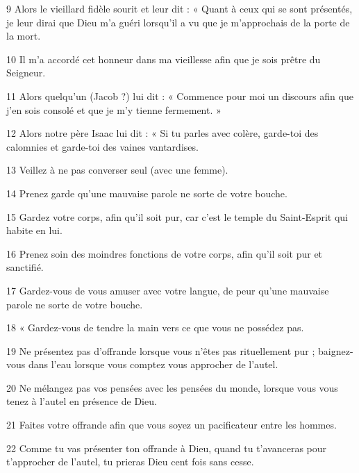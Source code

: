 \par 9 Alors le vieillard fidèle sourit et leur dit : « Quant à ceux qui se sont présentés, je leur dirai que Dieu m'a guéri lorsqu'il a vu que je m'approchais de la porte de la mort.

\par 10 Il m'a accordé cet honneur dans ma vieillesse afin que je sois prêtre du Seigneur.

\par 11 Alors quelqu'un (Jacob ?) lui dit : « Commence pour moi un discours afin que j'en sois consolé et que je m'y tienne fermement. »

\par 12 Alors notre père Isaac lui dit : « Si tu parles avec colère, garde-toi des calomnies et garde-toi des vaines vantardises.

\par 13 Veillez à ne pas converser seul (avec une femme).

\par 14 Prenez garde qu'une mauvaise parole ne sorte de votre bouche.

\par 15 Gardez votre corps, afin qu'il soit pur, car c'est le temple du Saint-Esprit qui habite en lui.

\par 16 Prenez soin des moindres fonctions de votre corps, afin qu'il soit pur et sanctifié.

\par 17 Gardez-vous de vous amuser avec votre langue, de peur qu'une mauvaise parole ne sorte de votre bouche.

\par 18 « Gardez-vous de tendre la main vers ce que vous ne possédez pas.

\par 19 Ne présentez pas d'offrande lorsque vous n'êtes pas rituellement pur ; baignez-vous dans l'eau lorsque vous comptez vous approcher de l'autel.

\par 20 Ne mélangez pas vos pensées avec les pensées du monde, lorsque vous vous tenez à l'autel en présence de Dieu.

\par 21 Faites votre offrande afin que vous soyez un pacificateur entre les hommes.

\par 22 Comme tu vas présenter ton offrande à Dieu, quand tu t'avanceras pour t'approcher de l'autel, tu prieras Dieu cent fois sans cesse.

